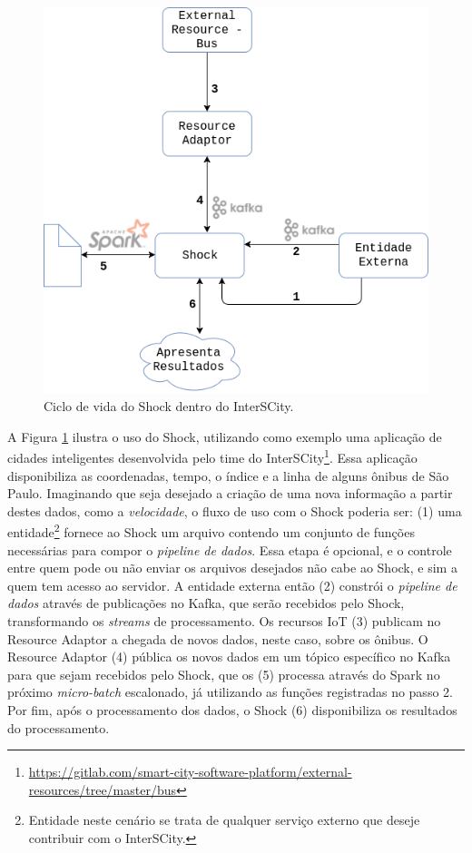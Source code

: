 \begin{figure}
  \centering
    \includegraphics[scale=0.45]{figuras/shock.png}
    \caption{Ciclo de vida do Shock dentro do InterSCity.}
  \label{fig:shock}
\end{figure}

A Figura \ref{fig:shock} ilustra o uso do Shock, utilizando como exemplo uma
aplicação de cidades inteligentes desenvolvida pelo time do
InterSCity\footnote{\url{https://gitlab.com/smart-city-software-platform/external-resources/tree/master/bus}}.
Essa aplicação disponibiliza as coordenadas, tempo, o índice e a linha de alguns
ônibus de São Paulo. Imaginando que seja desejado a criação de uma nova informação
a partir destes dados, como a \textit{velocidade}, o fluxo de uso com o Shock
poderia ser: (1) uma
entidade\footnote{Entidade neste cenário se trata de qualquer serviço externo que deseje
contribuir com o InterSCity.} fornece ao Shock um arquivo contendo um conjunto
de funções necessárias para compor o \textit{pipeline de dados}. Essa etapa é
opcional, e o controle entre quem pode ou não enviar os arquivos desejados não
cabe ao Shock, e sim a quem tem acesso ao servidor. A entidade externa então
(2) constrói o \textit{pipeline de dados} através de publicações no Kafka, que
serão recebidos pelo Shock, transformando os \textit{streams} de processamento.
Os recursos IoT (3) publicam no Resource Adaptor a chegada de novos dados,
neste caso, sobre os ônibus. O Resource Adaptor (4) pública os novos dados em um
tópico específico no Kafka para que sejam recebidos pelo Shock, que os (5)
processa através do Spark no próximo \textit{micro-batch} escalonado, já
utilizando as funções registradas no passo 2. Por fim, após o processamento
dos dados, o Shock (6) disponibiliza os resultados do processamento.
